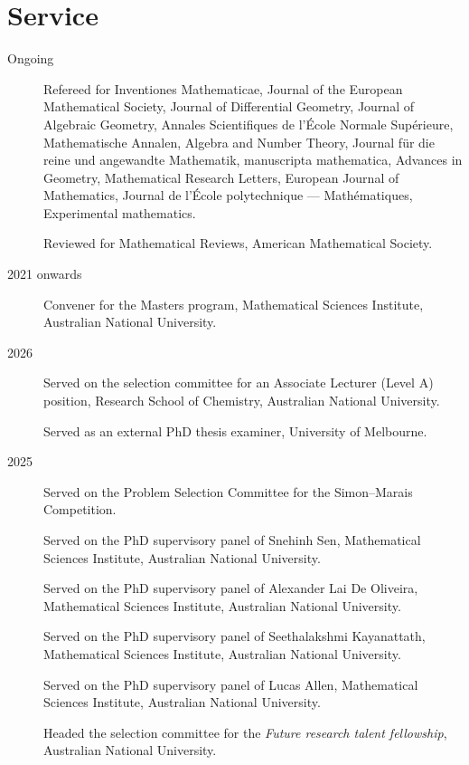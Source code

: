 \documentclass[11pt]{article}
\begin{document}
\section*{Service}
\label{sec:org6cc27a3}

\label{org0198d68}
\begin{description}
\item[{Ongoing}] Refereed for Inventiones Mathematicae, Journal of the European Mathematical Society, Journal of Differential Geometry, Journal of Algebraic Geometry, Annales Scientifiques de l'École Normale Supérieure, Mathematische Annalen, Algebra and Number Theory, Journal für die reine und angewandte Mathematik, manuscripta mathematica, Advances in Geometry, Mathematical Research Letters, European Journal of Mathematics, Journal de l'École polytechnique — Mathématiques, Experimental mathematics.

Reviewed for Mathematical Reviews, American Mathematical Society.
\item[{2021 onwards}] Convener for the Masters program, Mathematical Sciences Institute, Australian National University.
\item[{2026}] Served on the selection committee for an Associate Lecturer (Level A) position, Research School of Chemistry, Australian National University.

Served as an external PhD thesis examiner, University of Melbourne.
\item[{2025}] Served on the Problem Selection Committee for the Simon--Marais Competition.

Served on the PhD supervisory panel of Snehinh Sen, Mathematical Sciences Institute, Australian National University.

Served on the PhD supervisory panel of Alexander Lai De Oliveira, Mathematical Sciences Institute, Australian National University.

Served on the PhD supervisory panel of Seethalakshmi Kayanattath, Mathematical Sciences Institute, Australian National University.

Served on the PhD supervisory panel of Lucas Allen, Mathematical Sciences Institute, Australian National University.

Headed the selection committee for the \emph{Future research talent fellowship}, Australian National University.


\end{description}
\end{document}
